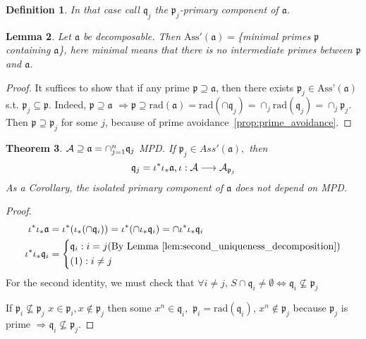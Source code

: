 \documentclass[11pt]{article}
\newtheorem{thm}{Theorem}[section]
\newtheorem{lemma}[thm]{Lemma}
\newtheorem{dfn}[thm]{Definition}
\newcommand{\sca}{{\mathfrak a}}
\newcommand{\scp}{{\mathfrak p}}
\newcommand{\scq}{\mathfrak q}
\newcommand{\cala}{{\cal A}}
\newcommand{\Lrta}{\Longrightarrow}
\newcommand{\lrta}{\longrightarrow}
\newcommand{\Llrta}{\Longleftrightarrow}
\begin{document}
\begin{dfn}
In that case call $\scq_j$ the $\scp_j$-primary component of  $\sca$.
\end{dfn}

\begin{lemma}\label{lem:Ass'_mimial_primes}
Let $\sca$ be decomposable. Then $\text{Ass}'(\sca)=$\{minimal primes $\scp$ containing $\sca$\}, here minimal means that there is no intermediate primes between $\scp$
 and $\sca$.
\end{lemma}
\begin{proof}
It suffices to show that if any prime $\scp\supseteq \sca$, then there exists $\scp_j\in \text{Ass'}(\sca)$ s.t. $\scp_j\subseteq \scp$. Indeed, $\scp\supseteq\sca$ $\Lrta\scp\supseteq\text{rad}(\sca)=\text{rad}(\cap \scq_j)=\cap_j\text{rad}(\scq_j)=\cap_j\scp_j$. Then $\scp\supseteq\scp_j$ for some $j$, because of prime avoidance~\ref{prop:prime_avoidance}.
\end{proof}

\begin{thm}
$\cala\supseteq \sca=\cap_{j=1}^n\scq_j$ MPD. If $\scp_j \in Ass'(\sca),$ then 
$$
\scq_j=\iota^*\iota_*\sca,\iota:\cala\lrta \cala_{\scp_{j}}
$$
As a Corollary, the isolated primary component of $\sca$ does not depend on MPD.
\end{thm}
\begin{proof}
$$
\begin{aligned}
\iota^*\iota_*\sca&=\iota^*(\iota_*(\cap\scq_i))=\iota^*(\cap\iota_*\scq_i)=\cap\iota^*\iota_*\scq_i\\
\iota^*\iota_*\scq_i&
=\left\{
\begin{aligned}
&\scq_i: i= j(\text{By Lemma~\ref{lem:second_uniqueness_decomposition}})\\
& (1) :i\neq j
\end{aligned}
\right.
\end{aligned}
$$
For the second identity, we must check that $\forall i\neq j$, $S\cap \scq_i\neq \emptyset\Llrta \scq_i\not\subseteq \scp_j$

If $\scp_i\not\subseteq \scp_j$ $x\in\scp_i,x\notin\scp_j$ then some $x^n\in\scq_i,$ $\scp_i=\text{rad}(\scq_i)$, $x^n\notin \scp_j$ because $\scp_j$ is prime $\Lrta \scq_i\not\subseteq \scp_j$.
\end{proof}
\end{document}
